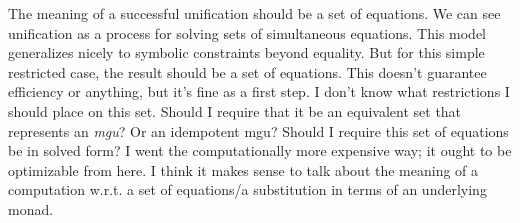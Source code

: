 \documentclass[11pt,twoside]{article}
\numberwithin{equation}{subsection} %
\begin{document}
The meaning of a successful unification should be a set of
equations. We can see unification as a process for solving sets of
simultaneous equations. This model generalizes nicely to symbolic
constraints beyond equality. But for this simple restricted case, the
result should be a set of equations. This doesn't guarantee efficiency
or anything, but it's fine as a first step. I don't know what
restrictions I should place on this set. Should I require that it be
an equivalent set that represents an \emph{mgu}? Or an idempotent mgu?
Should I require this set of equations be in solved form? I went the
computationally more expensive way; it ought to be optimizable from
here. I think it makes sense to talk about the meaning of a
computation w.r.t. a set of equations/a substitution in terms of an
underlying monad.

\vspace{.5cm}
\end{document}
